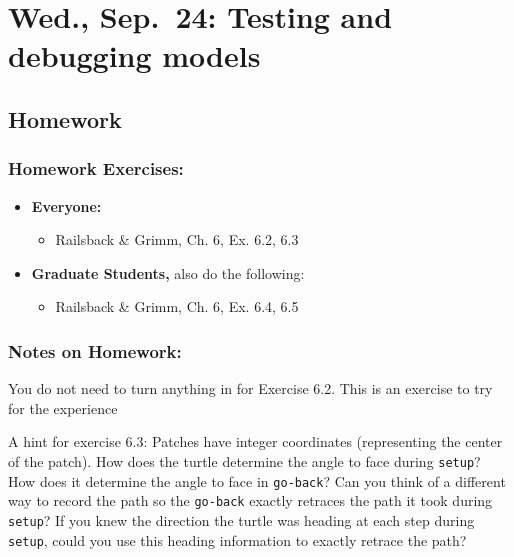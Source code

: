 \documentclass[
]{article}
\providecommand{\tightlist}{%
  \setlength{\itemsep}{0pt}\setlength{\parskip}{0pt}}
\begin{document}
\section{Wed., Sep.~24: Testing and debugging
models}\label{wed.-sep.-24-testing-and-debugging-models}

\subsection{Homework}\label{homework-6}

\subsubsection{Homework Exercises:}\label{homework-exercises-6}

\begin{itemize}
\item
  \textbf{Everyone:}

  \begin{itemize}
  \tightlist
  \item
    Railsback \& Grimm, Ch. 6, Ex. 6.2, 6.3
  \end{itemize}
\item
  \textbf{Graduate Students,} also do the following:

  \begin{itemize}
  \tightlist
  \item
    Railsback \& Grimm, Ch. 6, Ex. 6.4, 6.5
  \end{itemize}
\end{itemize}

\subsubsection{Notes on Homework:}\label{notes-on-homework-4}

You do not need to turn anything in for Exercise 6.2. This is an
exercise to try for the experience

A hint for exercise 6.3: Patches have integer coordinates (representing
the center of the patch). How does the turtle determine the angle to
face during \texttt{setup}? How does it determine the angle to face in
\texttt{go-back}? Can you think of a different way to record the path so
the \texttt{go-back} exactly retraces the path it took during
\texttt{setup}? If you knew the direction the turtle was heading at each
step during \texttt{setup}, could you use this heading information to
exactly retrace the path?
\end{document}
